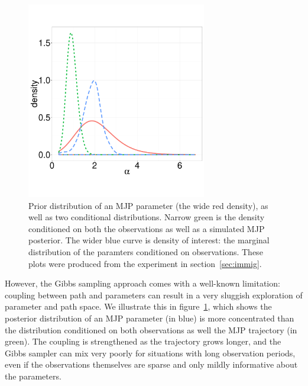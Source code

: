   \begin{figure}%
  \centering
  \begin{minipage}[hp]{0.44\linewidth}
  \centering
    \vspace{-0 in}
    \includegraphics [width=0.7\textwidth, angle=0]{figs/dist_beta.pdf}
    \vspace{0.1 in}
  \end{minipage}
  \begin{minipage}[hp]{0.55\linewidth}
    \vspace{-0.3 in}
  \caption{Prior distribution of an MJP parameter (the wide red density),
  as well as two conditional distributions. Narrow green is the
density conditioned on both the observations as well as a simulated
MJP posterior. The wider blue curve is density of interest: the
marginal distribution of the paramters conditioned on observations. These
plots were produced from the experiment in section~\ref{sec:immig}.}
     \label{fig:hist}
  \end{minipage}
    \vspace{-0.6 in}
  \end{figure}
  However, the Gibbs sampling approach %
  comes with a well-known limitation:
coupling between path and parameters can result in a very sluggish
exploration of parameter and path space. We illustrate this in figure~\ref{fig:hist},
which shows the posterior distribution of an MJP parameter (in blue)
is more concentrated than the distribution conditioned on both observations 
as well the MJP trajectory (in green). 
The coupling is strengthened as the trajectory grows longer, and
the Gibbs sampler can mix very poorly for situations with
long observation periods, even if the observations themselves are
sparse and only mildly informative about the parameters.

